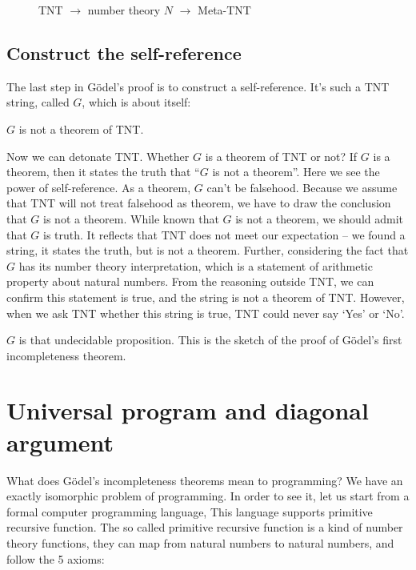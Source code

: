 \documentclass{article}
\begin{document}
\begin{figure}[htbp]
\centering
{}
\caption{TNT $\to$ number theory $N$ $\to$ Meta-TNT}
\label{fig:TNT-N-TNT}
\end{figure}

\subsection{Construct the self-reference}

The last step in Gödel's proof is to construct a self-reference. It's such a TNT string, called $G$, which is about itself:

\begin{center}
$G$ is not a theorem of TNT.
\end{center}

Now we can detonate TNT. Whether $G$ is a theorem of TNT or not? If $G$ is a theorem, then it states the truth that ``$G$ is not a theorem''. Here we see the power of self-reference. As a theorem, $G$ can't be falsehood. Because we assume that TNT will not treat falsehood as theorem, we have to draw the conclusion that $G$ is not a theorem. While known that $G$ is not a theorem, we should admit that $G$ is truth. It reflects that TNT does not meet our expectation -- we found a string, it states the truth, but is not a theorem. Further, considering the fact that $G$ has its number theory interpretation, which is a statement of arithmetic property about natural numbers. From the reasoning outside TNT, we can confirm this statement is true, and the string is not a theorem of TNT. However, when we ask TNT whether this string is true, TNT could never say `Yes' or `No'.

$G$ is that undecidable proposition. This is the sketch of the proof of Gödel's first incompleteness theorem.

\section{Universal program and diagonal argument}
What does Gödel's incompleteness theorems mean to programming? We have an exactly isomorphic problem of programming. In order to see it, let us start from a formal computer programming language, This language supports primitive recursive function. The so called primitive recursive function is a kind of number theory functions, they can map from natural numbers to natural numbers, and follow the 5 axioms:
\end{document}
